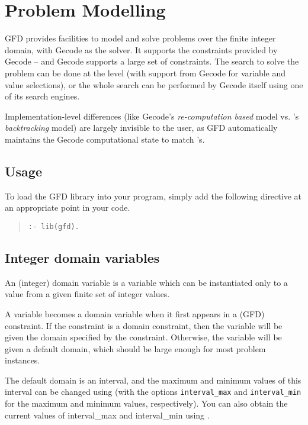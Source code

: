 \section{Problem Modelling}

GFD provides facilities to model and solve problems over the 
finite integer domain, with Gecode as the solver. It supports the constraints
provided by Gecode -- and Gecode supports a large set of constraints. The 
search to solve the problem can be done at the 
{\eclipse} level (with support from Gecode for variable and value selections), 
or the whole search can be performed by Gecode itself using one of its 
search engines.   

Implementation-level differences (like Gecode's 
{\it re-computation based\/} model vs. \eclipse's {\it backtracking\/}
model) are largely invisible to the user,
as GFD automatically maintains the Gecode computational state 
to match \eclipse's.

\subsection{Usage}

To load the GFD library into your program, simply add the following directive
at an appropriate point in your code.

\begin{quote}
\begin{verbatim}
:- lib(gfd).
\end{verbatim}
\end{quote}

\subsection{Integer domain variables}

An (integer) domain variable is a variable which can be instantiated only to a
value from a given finite set of integer values. 

A variable becomes a domain variable when it first appears in a (GFD) 
constraint. If the constraint is a domain constraint, then the variable will
be given the domain specified by the constraint. Otherwise, the variable will
be given a default domain, which should be large enough for
most problem instances. 

The default domain is an interval, and the maximum and minimum values of this
interval can be changed using  (with the options 
{\tt interval_max} and {\tt interval_min} for the maximum and minimum values,
respectively).  You can also obtain the current values
of interval_max and interval_min using .

